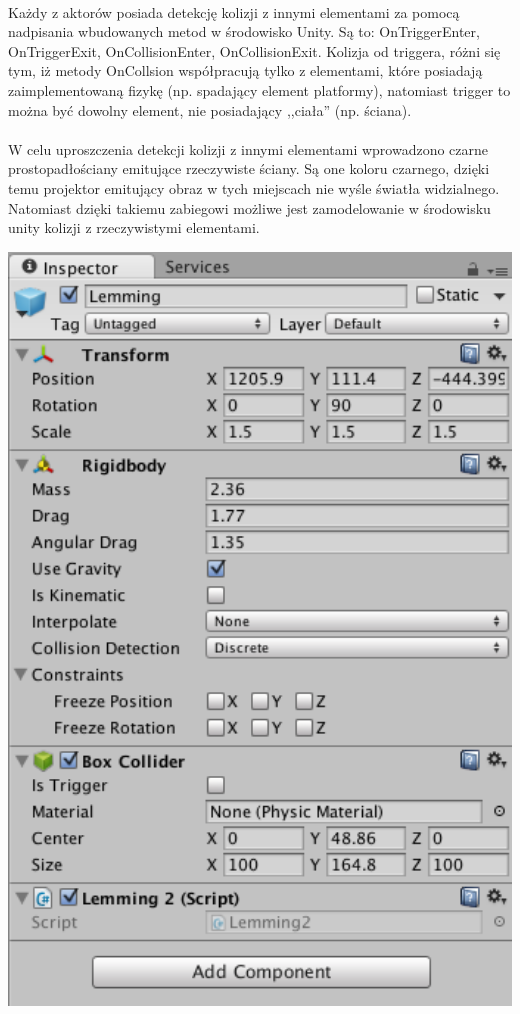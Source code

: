 \paragraph{}
Każdy z aktorów posiada detekcję kolizji z innymi elementami za pomocą nadpisania wbudowanych metod w środowisko Unity. Są to: OnTriggerEnter, OnTriggerExit, OnCollisionEnter, OnCollisionExit. Kolizja od triggera, różni się tym, iż metody OnCollsion współpracują tylko z elementami, które posiadają zaimplementowaną fizykę (np. spadający element platformy), natomiast trigger to można być dowolny element, nie posiadający ,,ciała'' (np. ściana).

\paragraph{}
W celu uproszczenia detekcji kolizji z innymi elementami wprowadzono czarne prostopadłościany emitujące rzeczywiste ściany. Są one koloru czarnego, dzięki temu projektor emitujący obraz w tych miejscach nie wyśle światła widzialnego. Natomiast dzięki takiemu zabiegowi możliwe jest zamodelowanie w środowisku unity kolizji z rzeczywistymi elementami.

\begin{center}
\includegraphics[width=1\textwidth]{images/aktor.png}
\end{center}

